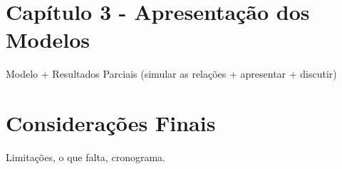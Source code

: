 \documentclass{article}
\begin{document}
\section*{Capítulo 3 - Apresentação dos Modelos}

Modelo + Resultados Parciais (simular as relações + apresentar + discutir)




\section*{Considerações Finais}

Limitações, o que falta, cronograma.
\end{document}
